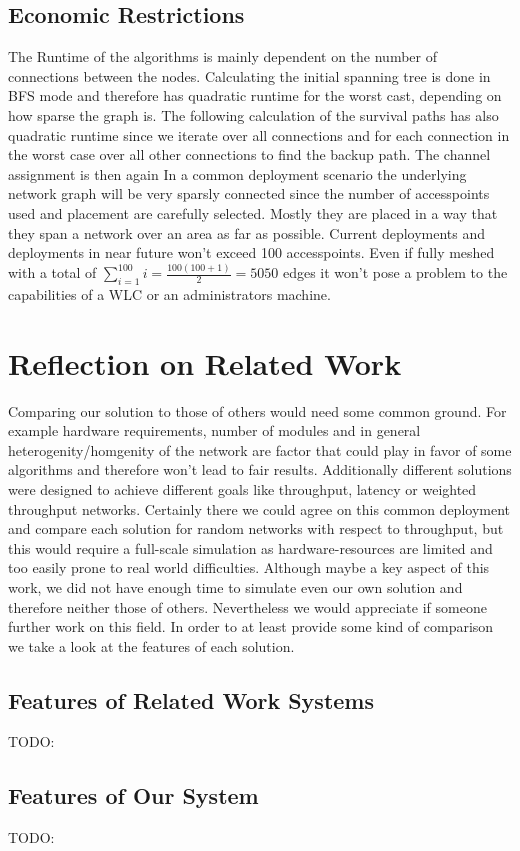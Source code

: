   \subsection{Economic Restrictions}
    The Runtime of the algorithms is mainly dependent on the number of connections between the nodes. Calculating the initial spanning tree is done in BFS mode and 
    therefore has quadratic runtime for the worst cast, depending on how sparse the graph is. The following calculation of the survival paths has also quadratic runtime 
    since we iterate over all connections and for each connection in the worst case over all other connections to find the backup path. The channel assignment is then again
    In a common deployment scenario the underlying network graph will be very sparsly connected since the number of accesspoints used and placement are carefully selected.
    Mostly they are placed in a way that they span a network over an area as far as possible.
    Current deployments and deployments in near future won't exceed 100 accesspoints. 
    Even if fully meshed with a total of \(\sum \limits_{i=1}^{100} i = \frac{100(100+1)}{2}=5050\)
    edges it won't pose a problem to the capabilities of a WLC or an administrators machine.
    
\section{Reflection on Related Work}
  Comparing our solution to those of others would need some common ground. For example hardware requirements, number of modules and in general heterogenity/homgenity of
  the network are factor that could play in favor of some algorithms and therefore won't lead to fair results. Additionally different solutions were designed to 
  achieve different goals like throughput, latency or weighted throughput networks. Certainly there we could agree on this common deployment and compare each solution for random
  networks with respect to throughput, but this would require a full-scale simulation as hardware-resources are limited and too easily prone to real world difficulties.
  Although maybe a key aspect of this work, we did not have enough time to simulate even our own solution and therefore neither those of others. Nevertheless we would appreciate
  if someone further work on this field. In order to at least provide some kind of comparison we take a look at the features of each solution.
  
  \subsection{Features of Related Work Systems}
    TODO:
  \subsection{Features of Our System}
    TODO: